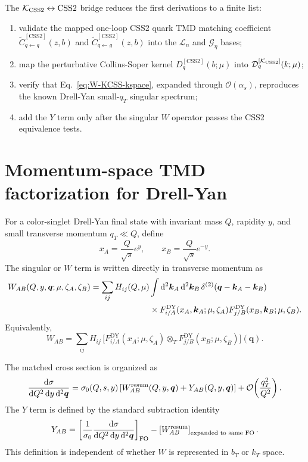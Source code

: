 \documentclass[11pt]{article}
\newcommand{\bk}{\bm{k}}
\newcommand{\bq}{\bm{q}}
\newcommand{\dd}{\mathrm{d}}
\newcommand{\as}{\alpha_s}
\newcommand{\muR}{\mu}
\newcommand{\zetaA}{\zeta_A}
\newcommand{\zetaB}{\zeta_B}
\newcommand{\deltaT}{\delta^{(2)}}
\newcommand{\ot}{\otimes_T}
\newcommand{\order}[1]{\mathcal{O}\!\left(#1\right)}
\newcommand{\FO}{\mathrm{FO}}
\newcommand{\DY}{\mathrm{DY}}
\newcommand{\KCSS}{\mathcal K_{\rm CSS2}}
\newcommand{\CSS}{\mathrm{CSS2}}
\begin{document}
The $\KCSS\leftrightarrow\CSS$ bridge reduces the first derivations to a finite list:
\begin{enumerate}
  \item validate the mapped one-loop CSS2 quark TMD matching coefficient
  $\widetilde C_{q\leftarrow q}^{[\CSS]}(z,b)$ and
  $\widetilde C_{q\leftarrow g}^{[\CSS]}(z,b)$ into the $\mathcal L_n$ and
  $\mathcal G_\eta$ bases;
  \item map the perturbative Collins-Soper kernel $D_q^{[\CSS]}(b;\mu)$ into
  $\mathcal D_q^{[\KCSS]}(k;\mu)$;
  \item verify that Eq.~\eqref{eq:W-KCSS-kspace}, expanded through $\order{\as}$,
  reproduces the known Drell-Yan small-$q_T$ singular spectrum;
  \item add the $Y$ term only after the singular $W$ operator passes the CSS2 equivalence
  tests.
\end{enumerate}

\section{Momentum-space TMD factorization for Drell-Yan}

For a color-singlet Drell-Yan final state with invariant mass $Q$, rapidity $y$, and small
transverse momentum $q_T\ll Q$, define
\begin{equation}
  x_A = \frac{Q}{\sqrt{s}}e^{y},
  \qquad
  x_B = \frac{Q}{\sqrt{s}}e^{-y}.
\end{equation}
The singular or $W$ term is written directly in transverse momentum as
\begin{align}
  W_{AB}(Q,y,\bq;\muR,\zetaA,\zetaB)
  &=
  \sum_{ij}
  H_{ij}(Q,\muR)
  \int \dd^2\bk_A\,\dd^2\bk_B\,
  \deltaT(\bq-\bk_A-\bk_B)
  \nonumber\\
  &\hspace{2.5cm}\times
  F^{\DY}_{i/A}(x_A,\bk_A;\muR,\zetaA)
  F^{\DY}_{j/B}(x_B,\bk_B;\muR,\zetaB).
  \label{eq:Wterm}
\end{align}
Equivalently,
\begin{equation}
  W_{AB}
  =
  \sum_{ij} H_{ij}\,
  \bigl[ F^{\DY}_{i/A}(x_A;\muR,\zetaA)\ot
         F^{\DY}_{j/B}(x_B;\muR,\zetaB) \bigr](\bq).
\end{equation}

The matched cross section is organized as
\begin{equation}
  \frac{\dd\sigma}{\dd Q^2\,\dd y\,\dd^2\bq}
  =
  \sigma_0(Q,s,y)
  \left[
    W_{AB}^{\rm resum}(Q,y,\bq)
    + Y_{AB}(Q,y,\bq)
  \right]
  + \order{\frac{q_T^2}{Q^2}}.
  \label{eq:matched-cross-section}
\end{equation}
The $Y$ term is defined by the standard subtraction identity
\begin{equation}
  Y_{AB}
  =
  \left[\frac{1}{\sigma_0}\frac{\dd\sigma}{\dd Q^2\,\dd y\,\dd^2\bq}\right]_{\FO}
  -
  \left[W_{AB}^{\rm resum}\right]_{\text{expanded to same FO}}.
  \label{eq:Yterm}
\end{equation}
This definition is independent of whether $W$ is represented in $b_T$ or $k_T$ space.
\end{document}
